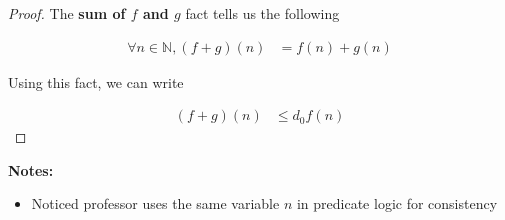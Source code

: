 \documentclass[12pt]{article}
\begin{document}
\begin{itemize}
\begin{mdframed}
\begin{proof}
            The \textbf{sum of $f$ and $g$} fact tells us the following

            \begin{align}
                \forall n \in \mathbb{N}, (f+g)(n) &= f(n) + g(n)
            \end{align}

            \bigskip

            Using this fact, we can write

            \begin{align}
                (f + g)(n) &\leq d_0f(n)
            \end{align}

        \end{proof}

    \end{mdframed}

    \bigskip

    \textbf{Notes:}

    \begin{itemize}
        \item Noticed professor uses the same variable $n$ in predicate logic for
        consistency
    \end{itemize}

\end{itemize}
\end{document}
